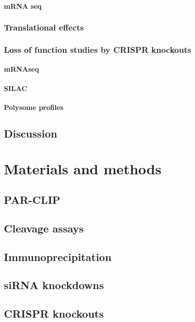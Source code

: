 \documentclass[12pt]{rockefeller}
\begin{document}
      \subsubsection{mRNA seq}

  \subsection{Translational effects}

  \subsection{Loss of function studies by CRISPR knockouts}

      \subsubsection{mRNAseq}

      \subsubsection{SILAC}

      \subsubsection{Polysome profiles}

\section{Discussion}


\chapter{Materials and methods}
\section{PAR-CLIP}
\section{Cleavage assays}
\section{Immunoprecipitation}
\section{siRNA knockdowns}
\section{CRISPR knockouts}
\end{document}
